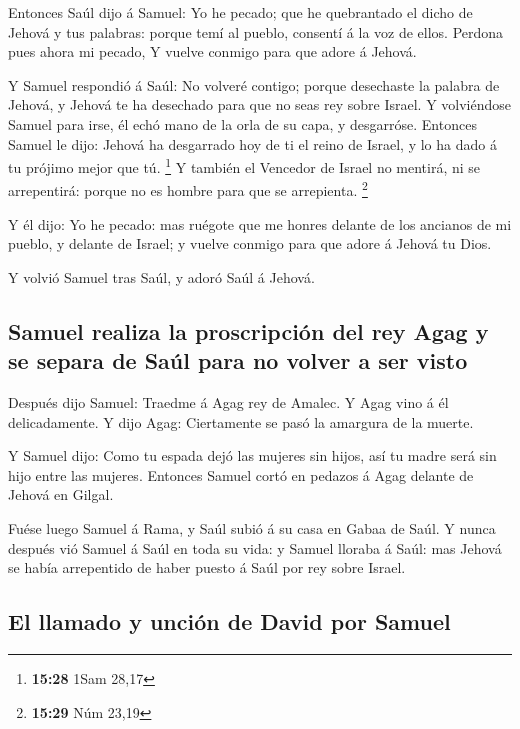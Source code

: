  Entonces Saúl dijo á Samuel: Yo he pecado; que he
quebrantado el dicho de Jehová y tus palabras: porque temí al pueblo,
consentí á la voz de ellos. Perdona pues ahora mi pecado, 
Y vuelve conmigo para que adore á Jehová.

 Y Samuel respondió á Saúl: No volveré contigo; porque
desechaste la palabra de Jehová, y Jehová te ha desechado para que no
seas rey sobre Israel.  Y volviéndose Samuel para irse, él
echó mano de la orla de su capa, y desgarróse.  Entonces
Samuel le dijo: Jehová ha desgarrado hoy de ti el reino de Israel, y lo
ha dado á tu prójimo mejor que tú. \footnote{\textbf{15:28} 1Sam 28,17}
 Y también el Vencedor de Israel no mentirá, ni se
arrepentirá: porque no es hombre para que se arrepienta. \footnote{\textbf{15:29}
  Núm 23,19}

 Y él dijo: Yo he pecado: mas ruégote que me honres delante
de los ancianos de mi pueblo, y delante de Israel; y vuelve conmigo para
que adore á Jehová tu Dios.

 Y volvió Samuel tras Saúl, y adoró Saúl á Jehová.

\hypertarget{samuel-realiza-la-proscripciuxf3n-del-rey-agag-y-se-separa-de-sauxfal-para-no-volver-a-ser-visto}{%
\subsection{Samuel realiza la proscripción del rey Agag y se separa de
Saúl para no volver a ser
visto}\label{samuel-realiza-la-proscripciuxf3n-del-rey-agag-y-se-separa-de-sauxfal-para-no-volver-a-ser-visto}}

 Después dijo Samuel: Traedme á Agag rey de Amalec. Y Agag
vino á él delicadamente. Y dijo Agag: Ciertamente se pasó la amargura de
la muerte.

 Y Samuel dijo: Como tu espada dejó las mujeres sin hijos,
así tu madre será sin hijo entre las mujeres. Entonces Samuel cortó en
pedazos á Agag delante de Jehová en Gilgal.

 Fuése luego Samuel á Rama, y Saúl subió á su casa en Gabaa
de Saúl.  Y nunca después vió Samuel á Saúl en toda su
vida: y Samuel lloraba á Saúl: mas Jehová se había arrepentido de haber
puesto á Saúl por rey sobre Israel.

\hypertarget{el-llamado-y-unciuxf3n-de-david-por-samuel}{%
\subsection{El llamado y unción de David por
Samuel}\label{el-llamado-y-unciuxf3n-de-david-por-samuel}}

